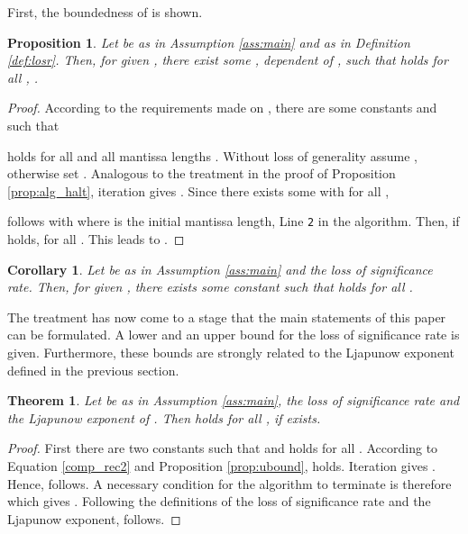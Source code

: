 \documentclass[copyright,creativecommons]{eptcs}
\newtheorem{proposition}{Proposition}[section]
\newtheorem{corollary}{Corollary}[section]
\newtheorem{theorem}{Theorem}[section]
\theoremstyle{definition}
\begin{document}
First, the boundedness of  is shown.
\begin{proposition}
Let  be as in Assumption \ref{ass:main} and 
as in Definition \ref{def:losr}. Then, for given , there exist
some , dependent of , such that
 holds for all
, .
\end{proposition}
\begin{proof}
According to the requirements made on , there are some constants
 and  such that

holds for all  and all mantissa lengths . Without loss
of generality assume , otherwise set .
Analogous to the treatment in the proof of Proposition
\ref{prop:alg_halt}, iteration gives 
.
Since there exists some  with  for all ,

follows with  where  is the initial
mantissa length, Line {\tt 2} in the algorithm. Then, if
 holds,
 for all
. This leads to
.
\end{proof}
\begin{corollary}
Let  be as in Assumption \ref{ass:main} and  the loss
of significance rate. Then, for given , there exists some
constant  such that  holds for all
.
\end{corollary}
The treatment has now come to a stage that the main statements of
this paper can be formulated. A lower and an upper bound for the
loss of significance rate is given. Furthermore, these bounds
are strongly related to the Ljapunow exponent  defined
in the previous section.
\begin{theorem}
\label{thm:main}
Let  be as in Assumption \ref{ass:main},  the loss
of significance rate and  the Ljapunow exponent of
. Then  holds for all
,  if  exists.
\end{theorem}
\begin{proof}
First there are two constants  such that 
and  holds for all .
According to Equation \ref{comp_rec2} and Proposition
\ref{prop:ubound}, 
holds. Iteration gives
.
Hence,  follows.
A necessary condition for the algorithm to terminate is therefore
 which gives
. Following the definitions of the loss of significance rate
and the Ljapunow exponent,  follows.
\end{proof}
\end{document}
